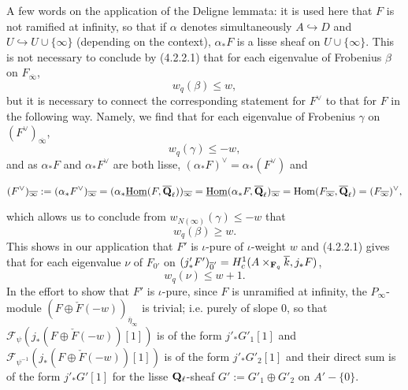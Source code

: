 \documentclass[deligne.tex]{subfiles}
\begin{document}
A few words on the application of the Deligne lemmata: it is used here that
$F$ is not ramified at infinity, so that if $\alpha$ denotes simultaneously 
$A\hookrightarrow D$ and $U\hookrightarrow U\cup\{\infty\}$ (depending on
the context), $\alpha_*F$ is a lisse sheaf on $U\cup\{\infty\}$.
This is not necessary to conclude by (4.2.2.1) that for each eigenvalue of
Frobenius $\beta$ on $F_{\overline\infty}$,
\begin{equation*}
	w_{q}(\beta)\leq w,
\end{equation*}
but it is necessary to connect the corresponding statement for $F^\vee$ to
that for $F$ in the following way.
Namely, we find that for each eigenvalue of Frobenius $\gamma$ on
$(F^\vee)_{\overline\infty}$,
\begin{equation*}
	w_{q}(\gamma)\leq -w,
\end{equation*}
and as $\alpha_*F$ and $\alpha_*F^\vee$ are both lisse,
$(\alpha_*F)^\vee=\alpha_*(F^\vee)$ and
\begin{ceqn}\begin{equation*}
	(F^\vee)_{\overline\infty}:=(\alpha_*F^\vee)_{\overline\infty}
	=(\alpha_*\underline{\operatorname{Hom}}(F,\overline{\mathbf{Q}}_\ell))_{\overline\infty}
	=\underline{\operatorname{Hom}}(\alpha_*F,\overline{\mathbf{Q}}_\ell)_{\overline\infty}
	=\operatorname{Hom}(F_{\overline\infty},\overline{\mathbf{Q}}_\ell)
	=(F_{\overline\infty})^\vee,
\end{equation*}\end{ceqn}
which allows us to conclude from $w_{N(\infty)}(\gamma)\leq -w$ that
\begin{equation*}
	w_{q}(\beta)\geq w.
\end{equation*}
This shows in our application that $F'$ is $\iota$-pure of $\iota$-weight
$w$ and (4.2.2.1) gives that for each eigenvalue $\nu$ of $F_{0'}$ on
$(j_*'F')_{\overline0'}=H^1_c(A\times_{\mathbf{F}_q}\overline k,j_*F)$,
\begin{equation*}
	w_{q}(\nu)\leq w+1.
\end{equation*}
In the effort to show that $F'$ is $\iota$-pure, since $F$ is unramified
at infinity, the $P_\infty$-module
$(F\oplus\check F(-w))_{\overline\eta_\infty}$ is trivial; i.e. purely of
slope 0, so that $\mathscr F_{\psi}(j_*(F\oplus\check F(-w))[1])$
is of the form $j'_*G'_1[1]$ and
$\mathscr F_{\psi^{-1}}(j_*(F\oplus\check F(-w))[1])$ is of the form
$j'_*G'_2[1]$ and their direct sum is of the form $j'_*G'[1]$ for
the lisse $\mathbf{Q}_\ell$-sheaf $G':=G'_1\oplus G'_2$ on $A'-\{0\}$.
\end{document}
